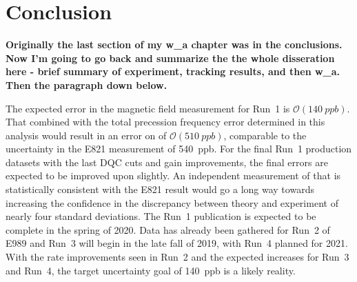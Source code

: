 
\thispagestyle{myheadings} %

\chapter{Conclusion}
\label{chapter:Conclusion}

\textbf{Originally the last section of my w\_a chapter was in the conclusions. Now I'm going to go back and summarize the the whole disseration here - brief summary of experiment, tracking results, and then w\_a. Then the paragraph down below.}



The expected error in the magnetic field measurement for Run~1 is $\mathcal{O}(\SI{140}{ppb})$. That combined with the total precession frequency error determined in this analysis would result in an error on \amu of $\mathcal{O}(\SI{510}{ppb})$, comparable to the uncertainty in the E821 measurement of \SI{540}{ppb}. For the final Run~1 production datasets with the last DQC cuts and gain improvements, the final errors are expected to be improved upon slightly. An independent measurement of \amu that is statistically consistent with the E821 result would go a long way towards increasing the confidence in the discrepancy between theory and experiment of nearly four standard deviations. The Run~1 publication is expected to be complete in the spring of 2020. Data has already been gathered for Run~2 of E989 and Run~3 will begin in the late fall of 2019, with Run~4 planned for 2021. With the rate improvements seen in Run~2 and the expected increases for Run~3 and Run~4, the target uncertainty goal of \SI{140}{ppb} is a likely reality.













